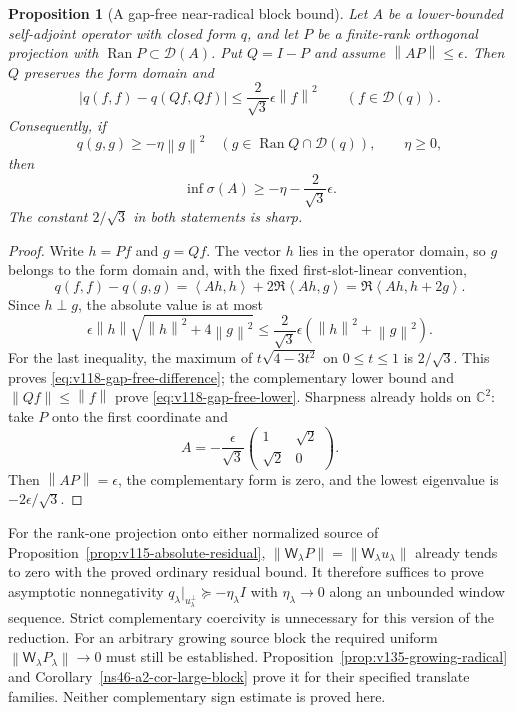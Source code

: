 \documentclass[11pt]{article}
\newtheorem{proposition}[theorem]{Proposition}
\theoremstyle{remark}
\newcommand{\norm}[1]{\left\lVert #1\right\rVert}
\newcommand{\ip}[2]{\left\langle #1,#2\right\rangle}
\begin{document}
\begin{proposition}[A gap-free near-radical block bound]
\label{prop:v118-gap-free}
Let $A$ be a lower-bounded self-adjoint operator with closed form $q$,
and let $P$ be a finite-rank orthogonal projection with
$\operatorname{Ran}P\subset\mathcal D(A)$.  Put $Q=I-P$ and assume
$\norm{AP}\le\epsilon$.  Then $Q$ preserves the form domain and
\begin{equation}\label{eq:v118-gap-free-difference}
 \left|q(f,f)-q(Qf,Qf)\right|
 \le\frac{2}{\sqrt3}\epsilon\norm f^2
 \qquad(f\in\mathcal D(q)).
\end{equation}
Consequently, if
\[
 q(g,g)\ge-\eta\norm g^2\quad
 (g\in\operatorname{Ran}Q\cap\mathcal D(q)),\qquad \eta\ge0,
\]
then
\begin{equation}\label{eq:v118-gap-free-lower}
 \inf\sigma(A)\ge-\eta-\frac{2}{\sqrt3}\epsilon.
\end{equation}
The constant $2/\sqrt3$ in both statements is sharp.
\end{proposition}
\begin{proof}
Write $h=Pf$ and $g=Qf$.  The vector $h$ lies in the operator domain,
so $g$ belongs to the form domain and, with the fixed first-slot-linear
convention,
\[
 q(f,f)-q(g,g)
 =\ip{Ah}{h}+2\Re\ip{Ah}{g}
 =\Re\ip{Ah}{h+2g}.
\]
Since $h\perp g$, the absolute value is at most
\[
 \epsilon\norm h\sqrt{\norm h^2+4\norm g^2}
 \le\frac{2}{\sqrt3}\epsilon
           (\norm h^2+\norm g^2).
\]
For the last inequality, the maximum of
$t\sqrt{4-3t^2}$ on $0\le t\le1$ is $2/\sqrt3$.
This proves \eqref{eq:v118-gap-free-difference}; the complementary
lower bound and $\norm{Qf}\le\norm f$ prove
\eqref{eq:v118-gap-free-lower}.  Sharpness already holds on
$\mathbb C^2$: take $P$ onto the first coordinate and
\[
 A=-\frac{\epsilon}{\sqrt3}
   \begin{pmatrix}1&\sqrt2\\\sqrt2&0\end{pmatrix}.
\]
Then $\norm{AP}=\epsilon$, the complementary form is zero, and the
lowest eigenvalue is $-2\epsilon/\sqrt3$.
\end{proof}

For the rank-one projection onto either normalized source of
Proposition~\ref{prop:v115-absolute-residual},
$\norm{\mathsf W_\lambda P}=\norm{\mathsf W_\lambda u_\lambda}$
already tends to zero with the proved ordinary residual bound.
It therefore suffices to prove asymptotic nonnegativity
$q_\lambda|_{u_\lambda^\perp}\succeq-\eta_\lambda I$ with
$\eta_\lambda\to0$ along an unbounded window sequence.  Strict
complementary coercivity is unnecessary for this version of the
reduction.  For an arbitrary growing source block the required uniform
$\norm{\mathsf W_\lambda P_\lambda}\to0$ must still be established.
Proposition~\ref{prop:v135-growing-radical} and
Corollary~\ref{ns46-a2-cor-large-block} prove it for their specified
translate families. Neither complementary sign estimate is proved here.
\end{document}
